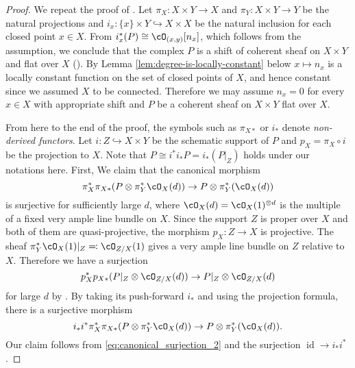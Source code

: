 \documentclass{amsart}
\numberwithin{equation}{section}
\theoremstyle{plain}
\theoremstyle{definition}
\DeclareMathOperator{\id}{\mathrm{id}}
\begin{document}
\begin{proof}
    We repeat the proof of \cite[Lemma 2.14]{MR2155085}.
    Let $\pi_X \colon X \times Y \to X$ and $\pi_Y \colon X \times Y \to Y$ be the natural projections and $i_x \colon \{x\} \times Y \hookrightarrow X \times X$ be the natural inclusion for each closed point $x \in X$.
    From $i_x^*(P) \cong \cO_{(x, y)}[n_x]$, which follows from the assumption, we conclude that the complex $P$ is a shift of coherent sheaf on $X \times Y$ and flat over $X$ (\cite[Lemma 4.3]{MR1651025}).
    By Lemma \ref{lem:degree-is-locally-constant} below $x \mapsto n_x$ is a locally constant function on the set of closed points of $X$,
    and hence constant since we assumed $X$ to be connected.
    Therefore we may assume $n_x=0$ for every $x \in X$ with appropriate shift and $P$ be a coherent sheaf on $X \times Y$ flat over $X$.

    From here to the end of the proof, the symbols such as $\pi_{X*}$ or $i_*$ denote \emph{non-derived functors}.
    Let $i \colon Z \hookrightarrow X \times Y$ be the schematic support of $P$ and $p_X = \pi_X \circ i$ be the projection to $X$.
    Note that $P \cong i^*i_*P = i_*(P\vert_Z)$ holds under our notations here.
    First, We claim that the canonical morphism
    \begin{equation}\label{eq:canonical_surjection}
        \pi_X^* \pi_{X*}(P \otimes \pi_Y^*\cO_X(d)) \to P \otimes \pi_Y^*(\cO_X(d))
    \end{equation}
    is surjective for sufficiently large $d$, where $\cO_X(d) = \cO_X(1)^{\otimes d}$ is the multiple of a fixed very ample line bundle on $X$.
    Since the support $Z$ is proper over $X$ and both of them are quasi-projective, the morphism $p_X \colon Z \to X$ is projective. The sheaf $\pi_Y^*\cO_X(1)\vert_Z \eqqcolon \cO_{Z/X}(1)$ gives a very ample line bundle on $Z$ relative to $X$. Therefore we have a surjection
    \begin{equation}
        p_X^* p_{X*}(P\vert_Z \otimes \cO_{Z/X}(d)) \to P\vert_Z \otimes \cO_{Z/X}(d)
    \end{equation}
    for large $d$ by \cite[Theorem III 8.8]{MR0463157}.
    By taking its push-forward $i_*$ and using the projection formula, there is a surjective morphism
    \begin{equation}\label{eq:canonical_surjection_2}
        i_*i^*\pi_X^* \pi_{X*}(P \otimes \pi_Y^*\cO_X(d)) \to P \otimes \pi_Y^*(\cO_X(d)).
    \end{equation}
    Our claim follows from \eqref{eq:canonical_surjection_2} and the surjection $\id \to i_*i^*$.



\end{proof}
\end{document}
